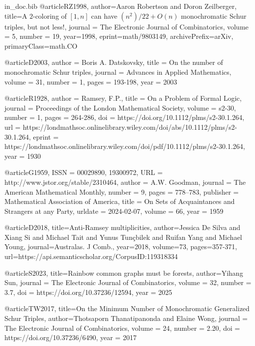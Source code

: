 \begin{filecontents}{in_doc.bib}
@article{RZ1998,
    author={Aaron Robertson and Doron Zeilberger},
      title={A $2$-coloring of $[1,n]$ can have $(n^2)/22 + {O}(n)$ monochromatic {S}chur triples, but not less!}, 
      journal = {The Electronic Journal of Combinatorics},
volume = {5},
number = {19},
      year={1998},
      eprint={math/9803149},
      archivePrefix={arXiv},
      primaryClass={math.CO}
}

@article{D2003,
author = {Boris A. Datskovsky},
title = {On the number of monochromatic {S}chur triples},
journal = {Advances in Applied Mathematics},
volume = {31},
number = {1},
pages = {193-198},
year = {2003}
}

@article{R1928,
author = {Ramsey, F.P.},
title = {On a Problem of Formal Logic},
journal = {Proceedings of the London Mathematical Society},
volume = {s2-30},
number = {1},
pages = {264-286},
doi = {https://doi.org/10.1112/plms/s2-30.1.264},
url = {https://londmathsoc.onlinelibrary.wiley.com/doi/abs/10.1112/plms/s2-30.1.264},
eprint = {https://londmathsoc.onlinelibrary.wiley.com/doi/pdf/10.1112/plms/s2-30.1.264},
year = {1930}
}

@article{G1959,
 ISSN = {00029890, 19300972},
 URL = {http://www.jstor.org/stable/2310464},
 author = {A.W. Goodman},
 journal = {The American Mathematical Monthly},
 number = {9},
 pages = {778--783},
 publisher = {Mathematical Association of America},
 title = {On Sets of Acquaintances and Strangers at any Party},
 urldate = {2024-02-07},
 volume = {66},
 year = {1959}
}

@article{D2018,
  title={Anti-{R}amsey multiplicities},
  author={Jessica De Silva and Xiang Si and Michael Tait and Yunus Tunçbilek and Ruifan Yang and Michael Young},
  journal={Australas. J Comb.},
  year={2018},
  volume={73},
  pages={357-371},
  url={https://api.semanticscholar.org/CorpusID:119318334}
}

@article{S2023,
      title={Rainbow common graphs must be forests}, 
      author={Yihang Sun},
      journal = {The Electronic Journal of Combinatorics},
volume = {32},
number = {3.7},
doi = {https://doi.org/10.37236/12594},
year = {2025}
}

@article{TW2017,
      title={On the Minimum Number of Monochromatic Generalized {S}chur Triples}, 
      author={Thotsaporn Thanatipanonda and Elaine Wong},
      journal = {The Electronic Journal of Combinatorics},
volume = {24},
number = {2.20},
doi = {https://doi.org/10.37236/6490},
year = {2017}
}


\end{filecontents}
